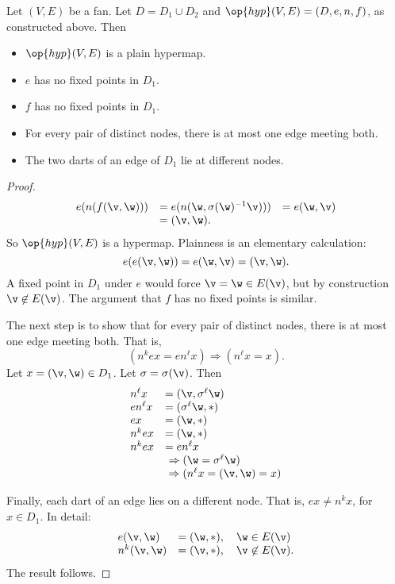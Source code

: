 \begin{lemma}[]\label{lemma:fan-plain}
Let $(V,E)$ be a fan.  Let $D = D_1\cup D_2$
and $\op{hyp}(V,E) = (D,e,n,f)$, as constructed above.  Then
\begin{itemize}
\item $\op{hyp}(V,E)$ is a plain hypermap.
\item  $e$ has no fixed
points in $D_1$.
\item  $f$ has no fixed points in $D_1$.
\item For every pair of distinct nodes, there is at most one
edge meeting both.
\item The two darts of an edge of $D_1$ lie at different nodes.
\end{itemize}
%
\end{lemma}

\begin{proof}  
\begin{displaymath}
\begin{array}{lll}
e(n(f(\v,\w))) &= e(n(\w,\sigma(\w)^{-1} \v))) &=
e(\w,\v)\\ 
&= (\v,\w).
\end{array}
\end{displaymath}
So $\op{hyp}(V,E)$ is a hypermap. 
Plainness is an elementary calculation:
\begin{displaymath}e(e(\v,\w)) = e(\w,\v) = (\v,\w).\end{displaymath}
A fixed point in $D_1$ under $e$ would force $\v = \w\in E(\v)$,
but by construction $\v\not\in E(\v)$.  The argument that $f$ has no
fixed points is similar.

The next step is to show that for every pair of distinct nodes, there
is at most one edge meeting both.  That is,
\begin{displaymath}(n^k e x = e n^\ell x)\Rightarrow (n^\ell x =
x).\end{displaymath} Let $x = (\v,\w)\in D_1$.  Let
$\sigma=\sigma(\v)$. Then
\begin{displaymath}
\begin{array}{lllllll}
n^\ell x &= (\v,\sigma^\ell \w)\\
e n^\ell x &= (\sigma^\ell \w,*)\\
e x &= (\w,*)\\
n^k e x &= (\w,*)\\
n^k e x &= e n^\ell x \\&\ \Rightarrow (\w = \sigma^\ell \w) \\&\ \Rightarrow
(n^\ell x = (\v,\w) = x)
\end{array}
\end{displaymath}

Finally,  each dart of an edge lies on a different node.
That is, $e x \ne n^k x$, for $x\in D_1$.   In detail:
\begin{displaymath}
\begin{array}{lll}
e(\v,\w) &= (\w,*),\quad \w\in E(\v)\\
n^k(\v,\w) &= (\v,*),\quad \v\not\in E(\v).
\end{array}
\end{displaymath}
The result follows.
\end{proof}

